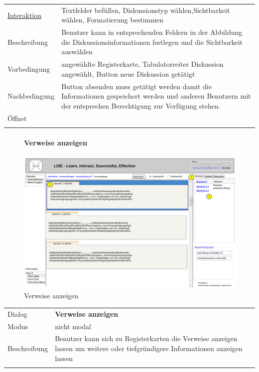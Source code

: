 \documentclass[12pt,a4paper]{article}
\begin{document}
{\begin{tabular}{l p{12cm}}
\underline{Interaktion} & Textfelder befüllen, Diskussionstyp wählen,Sichtbarkeit wählen, Formatierung bestimmen\\ 
Beschreibung   	 		& Benutzer kann in entsprechenden Feldern in der Abbildung die Diskussionsinformationen festlegen und die Sichtbarkeit auswählen  \\
Vorbedingung	 		&angewählte Registerkarte,  Tabulatorreiter Diskussion angewählt, Button neue Diskussion getätigt\\
Nachbedingung	 		& Button absenden muss getätigt werden damit die Informationen gespeichert werden und anderen Benutzern mit der entsprechen Berechtigung zur Verfügung stehen.\\
Öffnet			 		& \\\\
\end{tabular}

\begin{figure}[H]
	\centering
	\paragraph{Verweise anzeigen}
	\includegraphics[width=\textwidth]{Bilder/Mockups/GUI/VerweiseAnzeigen[Benutzer].png}
	\caption{Verweise anzeigen}
	\label{GuiVerweiseAnzeigen}
\end{figure}

\begin{tabular}{l p{12cm}}
Dialog 	 		 & \textbf{Verweise anzeigen} \\ 
Modus 			 & nicht modal\\ 
Beschreibung   	 & Benutzer kann sich zu Registerkarten die Verweise anzeigen lassen um weitere oder tiefgründigere Informationen anzeigen lassen\\\\


\end{tabular}}
\end{document}
